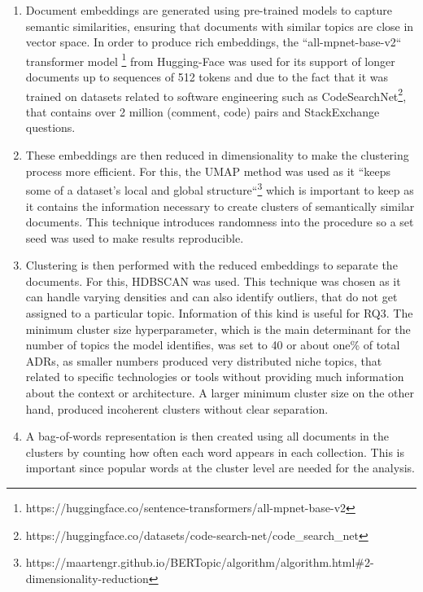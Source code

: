         \begin{enumerate}
            \item Document embeddings are generated using pre-trained models to capture semantic similarities, ensuring that documents with similar topics are close in vector space. In order to produce rich embeddings, the ``all-mpnet-base-v2`` transformer model \footnote{https://huggingface.co/sentence-transformers/all-mpnet-base-v2} from Hugging-Face was used for its support of longer documents up to sequences of 512 tokens and due to the fact that it was trained on datasets related to software engineering such as CodeSearchNet\footnote{https://huggingface.co/datasets/code-search-net/code\_search\_net}, that contains over 2 million (comment, code) pairs and StackExchange questions.
            
            \item These embeddings are then reduced in dimensionality to make the clustering process more efficient. For this, the UMAP method was used as it ``keeps some of a dataset's local and global structure``\footnote{https://maartengr.github.io/BERTopic/algorithm/algorithm.html\#2-dimensionality-reduction} which is important to keep as it contains the information necessary to create clusters of semantically similar documents. This technique introduces randomness into the procedure so a set seed was used to make results reproducible.

            \item Clustering is then performed with the reduced embeddings to separate the documents. For this, HDBSCAN was used. This technique was chosen as it can handle varying densities and can also identify outliers, that do not get assigned to a particular topic. Information of this kind is useful for RQ3. The minimum cluster size hyperparameter, which is the main determinant for the number of  topics the model identifies, was set to 40 or about one\% of total ADRs, as smaller numbers produced very distributed niche topics, that related to specific technologies or tools without providing much information about the context or architecture. A larger minimum cluster size on the other hand, produced incoherent clusters without clear separation.

            \item A bag-of-words representation is then created using all documents in the clusters by counting how often each word appears in each collection. This is important since popular words at the cluster level are needed for the analysis. 


\end{enumerate}
